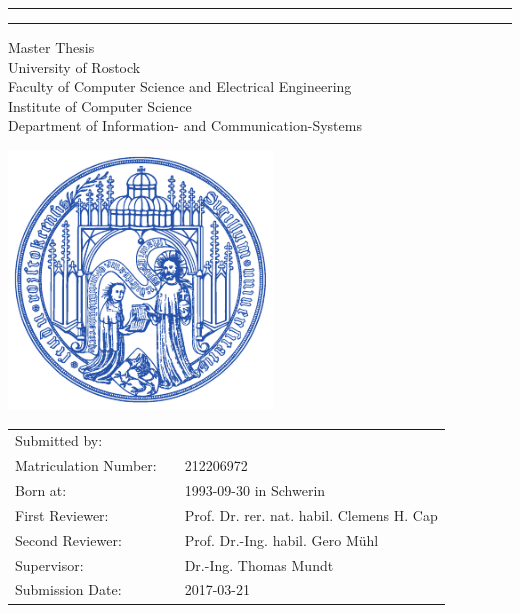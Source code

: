\begin{titlepage}

	\begin{center}
		
		\hrule
		\vspace{0.5cm}
		\LARGE {\bfseries \thetitle}
		\vspace{0.5cm}
		\hrule
		
		\vspace{0.8cm}
		\Large {Master Thesis}\\
		\vspace{1.0cm}
		\large {University of Rostock\\
		Faculty of Computer Science and Electrical Engineering\\
		Institute of Computer Science\\
		Department of Information- and Communication-Systems}
		
		\vfill
		\includegraphics[width=7cm]{style/UNI-Logo.pdf}
		
	\end{center}
	
	\vfill
	\large
	\begin{tabular}{lcl}
		Submitted by: &&  \theauthor \\
		Matriculation Number: && 212206972\\
		Born at: && 1993-09-30 in Schwerin\\
		First Reviewer: && Prof. Dr. rer. nat. habil. Clemens H. Cap\\
		Second Reviewer: && Prof. Dr.-Ing. habil. Gero Mühl\\
		Supervisor: && Dr.-Ing. Thomas Mundt\\
		Submission Date: && 2017-03-21
	\end{tabular}
	\normalsize
	
	
\end{titlepage}